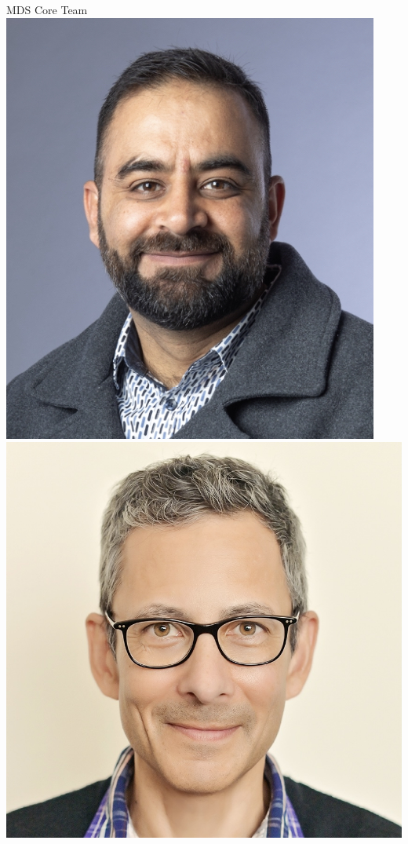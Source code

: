 \documentclass[
  ignorenonframetext,
  aspectratio=169,
]{beamer}
\begin{document}
\begin{frame}{MDS Core Team}
\label{mds-core-team}
\includegraphics{usman-a.jpeg} \includegraphics{joe-b.jpg}

\end{frame}
\end{document}
